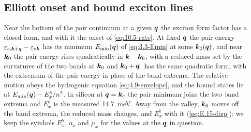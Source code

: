 \subsection{Elliott onset and bound exciton lines}\label{sec:10.5-lines}

Near the bottom of the pair continuum at a given $\bm{q}$ the exciton form factor has a closed form, and with it the onset of \cref{eq:10.5-rate}. At fixed $\bm{q}$ the pair energy $\varepsilon_{c,\bm{k}+\bm{q}} - \varepsilon_{v\bm{k}}$ has its minimum $E_{\mathrm{min}}(\bm{q})$ of \cref{eq:3.3-Emin} at some $\bm{k}_0(\bm{q})$, and near $\bm{k}_0$ the pair energy rises quadratically in $\bm{k} - \bm{k}_0$, with a reduced mass set by the curvatures of the two bands at $\bm{k}_0$ and $\bm{k}_0 + \bm{q}$.  has the same quadratic form, with the extremum of the pair energy in place of the band extrema. The relative motion obeys the hydrogenic equation \cref{eq:4.9-envelope}, and the bound states lie at $E_{\mathrm{min}}(\bm{q}) - E_x^b/n^2$. In silicon at $\bm{q} = \bm{k}_{\mathrm{c}}$ the pair minimum joins the two band extrema and $E_x^b$ is the measured \SI{14.7}{meV}. Away from the valley, $\bm{k}_0$ moves off the band extrema, the reduced mass changes, and $E_x^b$ with it (\cref{eq:E.15-disp}); we keep the symbols $E_x^b$, $a_x$ and $\mu_x$ for the values at the $\bm{q}$ in question.

